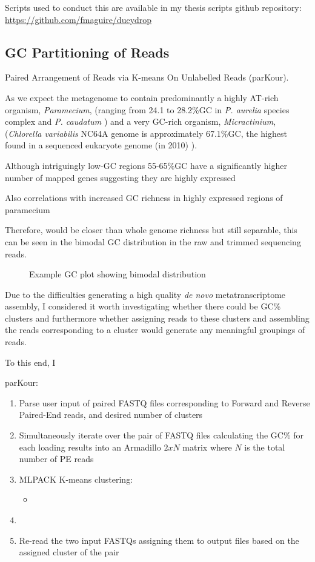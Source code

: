 Scripts used to conduct this are available in my thesis scripts github repository:
\url{https://github.com/fmaguire/dueydrop}

\subsection{GC Partitioning of Reads}
Paired Arrangement of Reads via K-means On Unlabelled Reads (parKour).

As we expect the metagenome to contain predominantly a highly AT-rich organism, \textit{Paramecium},
(ranging from 24.1 to 28.2\%GC in \textit{P. aurelia} species complex and \textit{P. caudatum} \citep{Aury2006,McGrath2014})
and a very GC-rich organism, \textit{Micractinium}, (\textit{Chlorella variabilis} NC64A genome is approximately 67.1\%GC, the highest
found in a sequenced eukaryote genome (in 2010) \citep{Blanc2010}).

Although intriguingly low-GC regions 55-65\%GC have a significantly higher number of mapped genes suggesting they are highly expressed \citep{Blanc2010}

Also correlations with increased GC richness in highly expressed regions of paramecium

Therefore,  would be closer than whole genome richness but still separable, this can be seen in the bimodal GC distribution in the raw and trimmed sequencing 
reads.

\begin{figure}
    Example GC plot showing bimodal distribution
\end{figure}

Due to the difficulties generating a high quality \textit{de novo} metatranscriptome assembly, I considered  it worth investigating whether there could be GC\%
clusters and furthermore whether assigning reads to these clusters and assembling the reads corresponding to a cluster would generate any meaningful groupings of reads.

To this end, I 

parKour:
\begin{enumerate}
    \item Parse user input of paired FASTQ files corresponding to Forward and Reverse Paired-End reads, and desired number of clusters
    \item Simultaneously iterate over the pair of FASTQ files calculating the GC\% for each loading results into an Armadillo \(2xN\) matrix where \(N\) is the total number of PE reads
    \item MLPACK K-means clustering:
        \begin{itemize}
            \item \
        \end{itemize}
    \item 
    \item Re-read the two input FASTQs assigning them to output files based on the assigned cluster of the pair
\end{enumerate}



